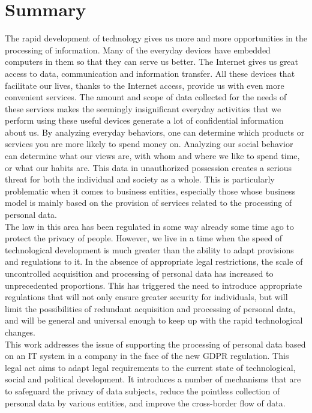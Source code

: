 \documentclass[en, noamssymb]{mgr}
\begin{document}
\chapter{Summary}
\label{sec:Podsumowanie}

The rapid development of technology gives us more and more opportunities in the processing of information. Many of the everyday devices have embedded computers in them so that they can serve us better. The Internet gives us great access to data, communication and information transfer. All these devices that facilitate our lives, thanks to the Internet access, provide us with even more convenient services. The amount and scope of data collected for the needs of these services makes the seemingly insignificant everyday activities that we perform using these useful devices generate a lot of confidential information about us. By analyzing everyday behaviors, one can determine which products or services you are more likely to spend money on. Analyzing our social behavior can determine what our views are, with whom and where we like to spend time, or what our habits are. This data in unauthorized possession creates a serious threat for both the individual and society as a whole. This is particularly problematic when it comes to business entities, especially those whose business model is mainly based on the provision of services related to the processing of personal data.\\
\indent The law in this area has been regulated in some way already some time ago to protect the privacy of people. However, we live in a time when the speed of technological development is much greater than the ability to adapt provisions and regulations to it. In the absence of appropriate legal restrictions, the scale of uncontrolled acquisition and processing of personal data has increased to unprecedented proportions. This has triggered the need to introduce appropriate regulations that will not only ensure greater security for individuals, but will limit the possibilities of redundant acquisition and processing of personal data, and will be general and universal enough to keep up with the rapid technological changes.\\
\indent This work addresses the issue of supporting the processing of personal data based on an IT system in a company in the face of the new GDPR regulation. This legal act aims to adapt legal requirements to the current state of technological, social and political development. It introduces a number of mechanisms that are to safeguard the privacy of data subjects, reduce the pointless collection of personal data by various entities, and improve the cross-border flow of data.\\
\end{document}
